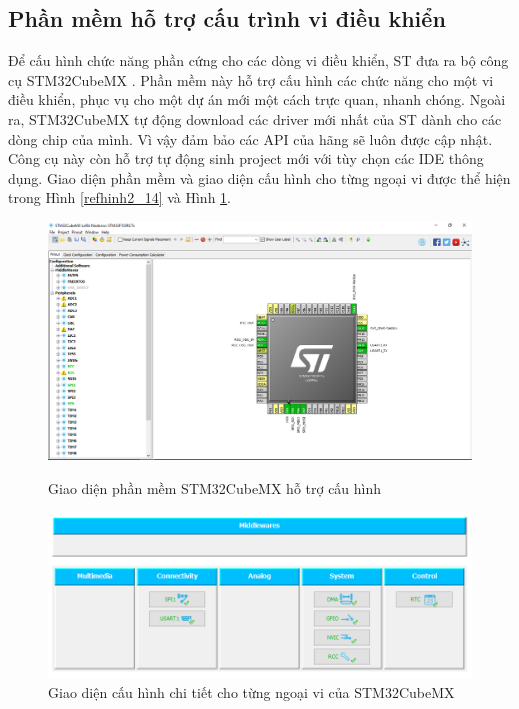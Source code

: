 \subsection{Phần mềm hỗ trợ cấu trình vi điều khiển}
Để cấu hình chức năng phần cứng cho các dòng vi điều khiển, ST đưa ra bộ công cụ STM32CubeMX \cite{10}. Phần mềm này hỗ trợ cấu hình các chức năng cho một vi điều khiển, phục vụ cho một dự án mới một cách trực quan, nhanh chóng. Ngoài ra, STM32CubeMX tự động download các driver mới nhất của ST dành cho các dòng chip của mình. Vì vậy đảm bảo các API của hãng sẽ luôn được cập nhật. Công cụ này còn hỗ trợ tự động sinh project mới với tùy chọn các IDE thông dụng. Giao diện phần mềm và giao diện cấu hình cho từng ngoại vi được thể hiện trong Hình \ref{refhinh2_14} và Hình \ref{refhinh2_15}{}.\\
\begin{figure}[h]
    \begin{center}
     \includegraphics[scale=0.24]{image/hinh2_14}
    \end{center}
    \caption{Giao diện phần mềm STM32CubeMX hỗ trợ cấu hình}
    \label{refhinh2_14}
   \begin{center}
     \includegraphics[scale=0.48]{image/hinh2_15}
    \end{center}
    \caption{Giao diện cấu hình chi tiết cho từng ngoại vi của STM32CubeMX}
    \label{refhinh2_15}
\end{figure}
